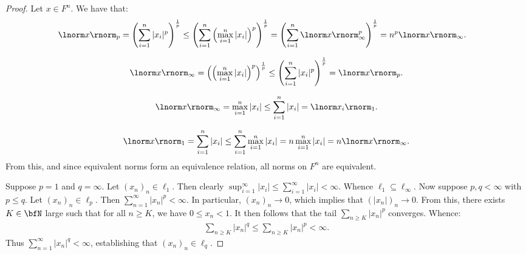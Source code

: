 \documentclass[11pt,twoside,openany]{memoir}
\begin{document}
        \begin{proof}
            Let $x \in F^n$. We have that:
                \begin{equation*}
                \begin{split}
                    \lnorm x \rnorm_p &= \left( \sum_{i = 1}^n |x_i|^p \right)^\frac{1}{p} 
                     \leq \left( \sum_{i = 1}^n \left( \max_{i = 1}^n |x_i| \right)^p \right)^\frac{1}{p} 
                     = \left( \sum_{i = 1}^n \lnorm x \rnorm_\infty ^p \right)^\frac{1}{p} 
                     = n^p \lnorm x \rnorm_\infty.
                \end{split}
                \end{equation*}

                \begin{equation*}
                \begin{split}
                    \lnorm x \rnorm_\infty = \left( \left( \max_{i = 1}^n |x_i| \right)^p \right)^\frac{1}{p} \leq \left( \sum_{i = 1}^n |x_i|^p \right)^\frac{1}{p} = \lnorm x \rnorm_p.
                \end{split}
                \end{equation*}

                \begin{equation*}
                \begin{split}
                    \lnorm x \rnorm_\infty = \max_{i = 1}^n |x_i| \leq \sum_{i = 1}^n |x_i| = \lnorm x_i \rnorm_1.
                \end{split}
                \end{equation*}

                \begin{equation*}
                \begin{split}
                    \lnorm x \rnorm_1 = \sum_{i = 1}^n |x_i| \leq \sum_{i = 1}^n \max_{i =1}^n |x_i| = n \max_{i = 1}^n |x_i| = n \lnorm x \rnorm_\infty.
                \end{split}
                \end{equation*}
            From this, and since equivalent norms form an equivalence relation, all norms on $F^n$ are equivalent.

            Suppose $p = 1$ and $q = \infty$. Let $(x_n)_n \in \ell_1$. Then clearly $\sup_{i=1}^\infty |x_i| \leq \sum_{i = 1}^\infty |x_i| < \infty$. Whence $\ell_1 \subseteq \ell_\infty$. Now suppose $p,q < \infty$ with $p \leq q$. Let $(x_n)_n \in \ell_p$. Then $\sum_{n = 1}^\infty |x_n|^p < \infty$. In particular, $(x_n)_n \rightarrow 0$, which implies that $(|x_n|)_n \rightarrow 0$. From this, there exists $K \in \bfN$ large such that for all $n \geq K$, we have $0 \leq x_n < 1$. It then follows that the tail $\sum_{n \geq K}|x_n|^p$ converges. Whence:
                \begin{equation*}
                \begin{split}
                    \sum_{n \geq K} |x_n|^q \leq \sum_{n \geq K}|x_n|^p < \infty.
                \end{split}
                \end{equation*}
            Thus $\sum_{n = 1}^\infty |x_n|^q < \infty$, establishing that $(x_n)_n \in \ell_q$.



\end{proof}
\end{document}
